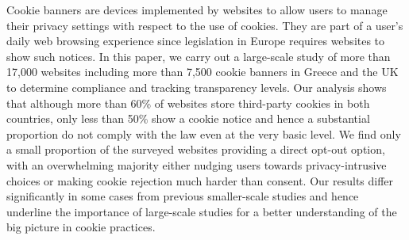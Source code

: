 \documentclass[../main.tex]{subfiles}
\begin{document}
Cookie banners are devices implemented by websites to allow users to manage their privacy settings with respect to the use of cookies. They are part of a user's daily web browsing experience since legislation in Europe requires websites to show such notices. In this paper, we carry out a large-scale study of more than 17,000 websites including more than 7,500 cookie banners in Greece and the UK to determine compliance and tracking transparency levels. Our analysis shows that although more than 60\% of websites store third-party cookies in both countries, only less than 50\% show a cookie notice and hence a substantial proportion do not comply with the law even at the very basic level. We find only a small proportion of the surveyed websites providing a direct opt-out option, with an overwhelming majority either nudging users towards privacy-intrusive choices or making cookie rejection much harder than consent. Our results differ significantly in some cases from previous smaller-scale studies and hence underline the importance of large-scale studies for a better understanding of the big picture in cookie practices. 
\end{document}

